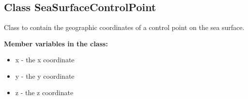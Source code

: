 \subsection{Class SeaSurfaceControlPoint} \label{Class SeaSurfaceControlPoint}
Class to contain the geographic coordinates of a control point on the sea 
surface. 

\textbf{Member variables in the class:} 
\begin{itemize} 
  \item x - the x coordinate 
  \item y - the y coordinate
  \item z - the z coordinate
\end{itemize}

